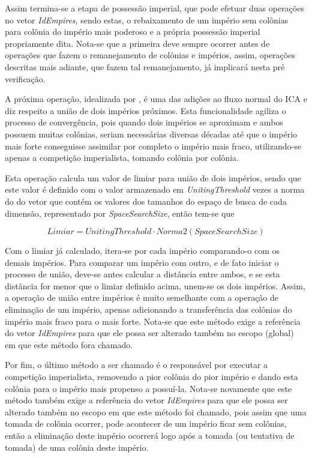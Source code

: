 Assim termina-se a etapa de possessão imperial, que pode efetuar duas operações no vetor \emph{IdEmpires}, sendo estas, o rebaixamento de um império sem colônias para colônia do império mais poderoso e a própria possessão imperial propriamente dita. Nota-se que a primeira deve sempre ocorrer antes de operações que fazem o remanejamento de colônias e impérios, assim, operações descritas mais adiante, que fazem tal remanejamento, já implicará nesta pré verificação.

A próxima operação, idealizada por \cite{roche2011imperialist}, é uma das adições ao fluxo normal do ICA e diz respeito a união de dois impérios próximos. Esta funcionalidade agiliza o processo de convergência, pois quando dois impérios se aproximam e ambos possuem muitas colônias, seriam necessárias diversas décadas até que o império mais forte conseguisse assimilar por completo o império mais fraco, utilizando-se apenas a competição imperialista, tomando colônia por colônia.

Esta operação calcula um valor de limiar para união de dois impérios, sendo que este valor é definido com o valor armazenado em \emph{UnitingThreshold} vezes a norma do do vetor que contém os valores dos tamanhos do espaço de busca de cada dimensão, representado por \emph{SpaceSearchSize}, então tem-se que 

\[Limiar = UnitingThreshold \cdot Norma2(SpaceSearchSize) \]

Com o limiar já calculado, itera-se por cada império comparando-o com os demais impérios. Para comparar um império com outro, e de fato iniciar o processo de união, deve-se antes calcular a distância entre ambos, e se esta distância for menor que o limiar definido acima, unem-se os dois impérios. Assim, a operação de união entre impérios é muito semelhante com a operação de eliminação de um império, apenas adicionando a transferência das colônias do império mais fraco para o mais forte. Nota-se que este método exige a referência do vetor \emph{IdEmpires} para que ele possa ser alterado também no escopo (global) em que este método fora chamado.

Por fim, o último método a ser chamado é o responsável por executar a competição imperialista, removendo a pior colônia do pior império e dando esta colônia para o império mais propenso a possuí-la. Nota-se novamente que este método também exige a referência do vetor \emph{IdEmpires} para que ele possa ser alterado também no escopo em que este método foi chamado, pois assim que uma tomada de colônia ocorrer, pode acontecer de um império ficar sem colônias, então a eliminação deste império ocorrerá logo após a tomada (ou tentativa de tomada) de uma colônia deste império.


